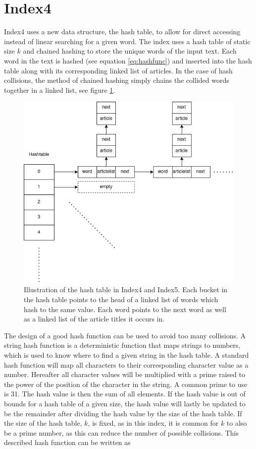 \section{Index4}
\label{section:Index4}

Index4 uses a new data structure, the hash table, to allow for direct accessing instead of linear searching for a given word. The index uses a hash table of static size $k$ and chained hashing to store the unique words of the input text. Each word in the text is hashed (see equation \ref{eq:hashfunc}) and inserted into the hash table along with its corresponding linked list of articles. In the case of hash collisions, the method of chained hashing simply chains the collided words together in a linked list, see figure \ref{fig:index4hash table}. 

\begin{figure}[ht!]
    \centering
    \includegraphics[width=.7\textwidth]{LaTeX/Figures/BasicPart/index4hashtable.png}
    \caption{Illustration of the hash table in Index4 and Index5. Each bucket in the hash table points to the head of a linked list of words which hash to the same value. Each word points to the next word as well as a linked list of the article titles it occurs in.}
    \label{fig:index4hash table}
\end{figure}

The design of a good hash function can be used to avoid too many collisions. A string hash function is a deterministic function that maps strings to numbers, which is used to know where to find a given string in the hash table. A standard hash function will map all characters to their corresponding character value as a number. Hereafter all character values will be multiplied with a prime raised to the power of the position of the character in the string. A common prime to use is 31. The hash value is then the sum of all elements. If the hash value is out of bounds for a hash table of a given size, the hash value will lastly be updated to be the remainder after dividing the hash value by the size of the hash table. If the size of the hash table, $k$, is fixed, as in this index, it is common for $k$ to also be a prime number, as this can reduce the number of possible collisions. This described hash function can be written as

